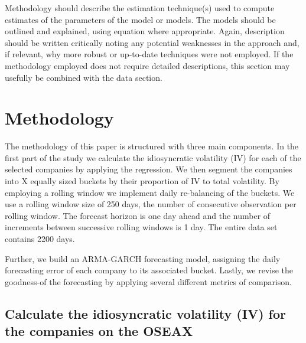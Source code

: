 Methodology should describe the estimation technique(s) used to compute estimates of the parameters of the model or models. The models should be outlined and explained, using equation where appropriate. Again, description should be written critically noting any potential weaknesses in the approach and, if relevant, why more robust or up-to-date techniques were not employed. If the methodology employed does not require detailed descriptions, this section may usefully be combined with the data section. 


\chapter{Methodology}

The methodology of this paper is structured with three main components. In the first part of the study we calculate the idiosyncratic volatility (IV) for each of the selected companies by applying the \cite{famafrench} regression. We then segment the companies into X equally sized buckets by their proportion of IV to total volatility. By employing a rolling window we implement daily re-balancing of the buckets. We use a rolling window size of 250 days, the number of consecutive observation per rolling window. The forecast horizon is one day ahead and the number of increments between successive rolling windows is 1 day. The entire data set contains 2200 days. 

Further, we build an ARMA-GARCH forecasting model, assigning the daily forecasting error of each company to its associated bucket. Lastly, we revise the goodness-of the forecasting by applying several different metrics of comparison.

\section*{Calculate the idiosyncratic volatility (IV) for the companies on the OSEAX} 

